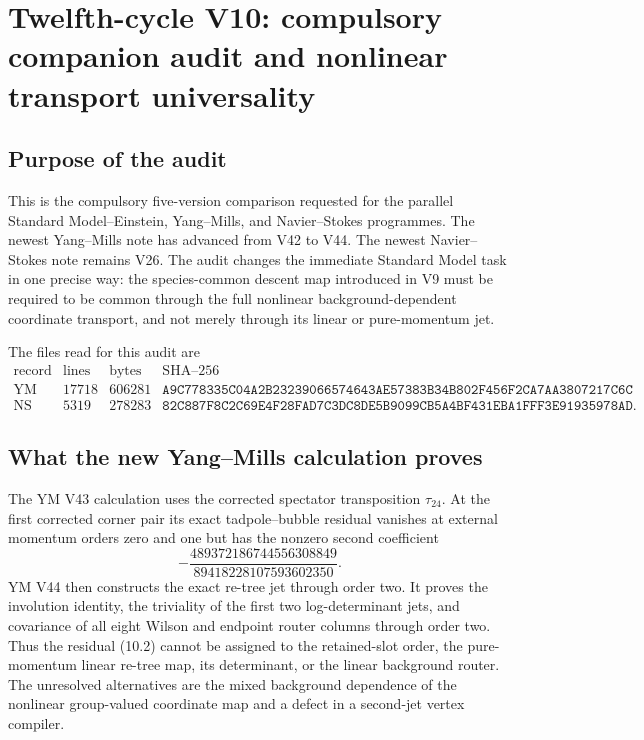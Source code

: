 \documentclass[11pt]{article}
\theoremstyle{remark}
\begin{document}
\section{Twelfth-cycle V10: compulsory companion audit and nonlinear
transport universality}
\label{sec:v12v10}

\subsection{Purpose of the audit}

This is the compulsory five-version comparison requested for the
parallel Standard Model--Einstein, Yang--Mills, and Navier--Stokes
programmes.  The newest Yang--Mills note has advanced from V42 to
V44.  The newest Navier--Stokes note remains V26.  The audit changes
the immediate Standard Model task in one precise way: the
species-common descent map introduced in V9 must be required to be
common through the full nonlinear background-dependent coordinate
transport, and not merely through its linear or pure-momentum jet.

The files read for this audit are
\[
\begin{array}{c|r|r|c}
\text{record}&\text{lines}&\text{bytes}&\text{SHA--256}\\ \hline
\text{YM V44}&17718&606281&
\texttt{A9C778335C04A2B23239066574643AE57383B34B802F456F2CA7AA3807217C6C}\\
\text{NS V26}&5319&278283&
\texttt{82C887F8C2C69E4F28FAD7C3DC8DE5B9099CB5A4BF431EBA1FFF3E91935978AD}.
\end{array}                                                   \tag{10.1}
\]

\subsection{What the new Yang--Mills calculation proves}

The YM V43 calculation uses the corrected spectator transposition
\(\tau_{24}\).  At the first corrected corner pair its exact
tadpole--bubble residual vanishes at external momentum orders zero
and one but has the nonzero second coefficient
\[
 -\frac{489372186744556308849}
        {89418228107593602350}.                              \tag{10.2}
\]
YM V44 then constructs the exact re-tree jet through order two.  It
proves the involution identity, the triviality of the first two
log-determinant jets, and covariance of all eight Wilson and endpoint
router columns through order two.  Thus the residual (10.2) cannot be
assigned to the retained-slot order, the pure-momentum linear
re-tree map, its determinant, or the linear background router.  The
unresolved alternatives are the mixed background dependence of the
nonlinear group-valued coordinate map and a defect in a second-jet
vertex compiler.
\end{document}
